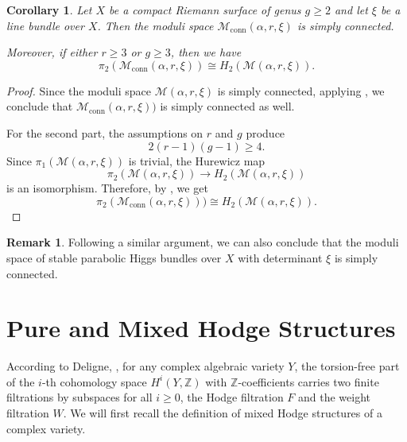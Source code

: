 \documentclass[11pt, reqno]{amsart}
\numberwithin{equation}{section}
\newtheorem{corollary}[theorem]{Corollary}
\theoremstyle{definition}
\newtheorem{remark}[definition]{Remark}
\begin{document}
 \begin{corollary}\label{cor}
     Let $X$ be a compact Riemann surface of genus $g \geq 2$ and let $\xi$ be a line bundle over $X$. Then the moduli space $\mathcal{M}_{\mathrm{conn}}(\alpha, r,\xi)$ is simply connected.
     
     Moreover, if either $r \geq 3$ or $g \geq 3$, then we have
     \[
     \pi_2(\mathcal{M}_{\mathrm{conn}}(\alpha, r, \xi)) \cong H_2(\mathcal{M}(\alpha, r,\xi)).
     \]
 \end{corollary}
 \begin{proof}
    Since the moduli space $\mathcal{M}(\alpha, r,\xi)$ is simply connected, applying , we conclude that $\mathcal{M}_{\mathrm{conn}}(\alpha, r, \xi))$ is simply connected as well. 

    For the second part, the assumptions on $r$ and $g$ produce
    \[
    2(r-1)(g-1) \geq 4.
    \]
Since $\pi_1(\mathcal{M}(\alpha, r,\xi))$ is trivial, the Hurewicz map
      \[
      \pi_2(\mathcal{M}(\alpha, r,\xi)) \longrightarrow H_2(\mathcal{M}(\alpha, r,\xi))
      \]
      is an isomorphism. Therefore, by , we get
      \[
      \pi_2(\mathcal{M}_{\mathrm{conn}}(\alpha, r, \xi))) \cong H_2(\mathcal{M}(\alpha, r,\xi)).
      \]
\end{proof}

\begin{remark}
    Following a similar argument, we can also conclude that the moduli space of stable parabolic Higgs bundles over $X$ with determinant $\xi$ is simply connected. 
\end{remark}


\section{Pure and Mixed Hodge Structures}\label{mhs}
According to Deligne, \cite{D72, D75}, for any complex algebraic variety $Y$, the torsion-free part of the $i$-th cohomology space $H^i(Y,\mathbb{Z})$ with $\mathbb{Z}$-coefficients carries two finite filtrations by subspaces for all $i \geq 0$, the Hodge filtration $F$ and the weight filtration $W$. We will first recall the definition of mixed Hodge structures of a complex variety.
\end{document}
